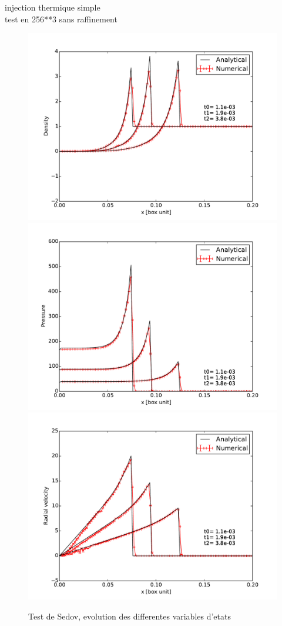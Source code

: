 injection thermique simple\\
test en 256**3 sans raffinement\\

\begin{figure}[bth]
        \includegraphics[width=.95\linewidth]{img/03/sedov/sedov_evol_8_den_lin.pdf} 
		\includegraphics[width=.95\linewidth]{img/03/sedov/sedov_evol_8_pres.pdf} 
		\includegraphics[width=.95\linewidth]{img/03/sedov/sedov_evol_8_vel.pdf} 
        \caption{Test de Sedov, evolution des differentes variables d'etats}
 		\label{fig:}
\end{figure}


